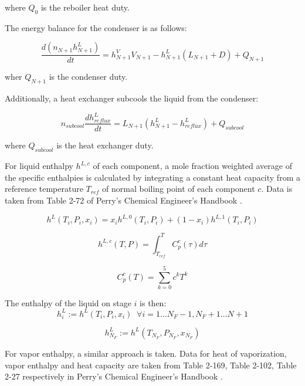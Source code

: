 where $Q_0$ is the reboiler heat duty.

The energy balance for the condenser is as follows:

\begin{equation}
    \frac{d(n_{N+1}h^L_{N+1})}{dt} = h^V_{N+1} V_{N+1}-h^L_{N+1}(L_{N+1} + D) + Q_{N+1}
\end{equation}

wher $Q_{N+1}$ is the condenser duty.

Additionally, a heat exchanger subcools the liquid from the condenser:

\begin{equation}
    n_{subcool}\frac{d h^L_{reflux}}{dt} = L_{N+1}(h^L_{N+1} - h^L_{reflux}) + Q_{subcool}
\end{equation}

where $Q_{subcool}$ is the heat exchanger duty.

For liquid enthalpy $h^{L,c}$ of each component, a mole fraction weighted average of the specific enthalpies is calculated by integrating a constant heat capacity from a reference temperature $T_{ref}$ of normal boiling point of each component $c$. Data is taken from Table 2-72 of Perry’s Chemical Engineer's Handbook \cite{Perrys2018}.

\begin{equation}
    h^L(T_i, P_i, x_i) = x_ih^{L,0}(T_i,P_i) + (1-x_i)h^{L,1}(T_i,P_i)
\end{equation}

\begin{equation}
    h^{L,c}(T,P) = \int_{T_{ref}}^T C_p^c(\tau)d\tau 
\end{equation}

\begin{equation}
    C_p^c(T) = \sum_{k=0}^5 c^kT^k 
\end{equation}

The enthalpy of the liquid on stage $i$ is then:
\begin{equation}
    h^L_i := h^L(T_i, P_i,x_i) \;\; \forall i = 1 \dots N_F-1, N_F+1 \dots N+1
\end{equation}

\begin{equation}
    h^L_{N_F} := h^L(T_{N_F}, P_{N_F},x_{N_F})
\end{equation}

For vapor enthalpy,  a similar approach is taken. Data for heat of vaporization, vapor enthalpy and heat capacity are taken from Table 2-169, Table 2-102, Table 2-27 respectively in Perry’s Chemical Engineer's Handbook \cite{Perrys2018}.

